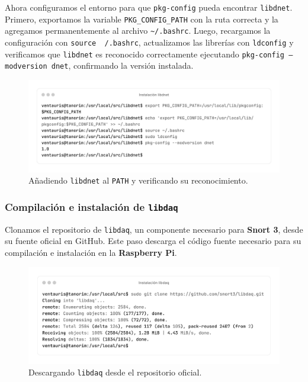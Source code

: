 \documentclass[11pt,a4paper,twoside]{report}
\begin{document}
Ahora configuramos el entorno para que \texttt{pkg-config} pueda encontrar \texttt{libdnet}. Primero, exportamos la variable \texttt{PKG\_CONFIG\_PATH} con la ruta correcta y la agregamos permanentemente al archivo \texttt{\~{}/.bashrc}. Luego, recargamos la configuración con \texttt{source ~/.bashrc}, actualizamos las librerías con \texttt{ldconfig} y verificamos que \texttt{libdnet} es reconocido correctamente ejecutando \texttt{pkg-config --modversion dnet}, confirmando la versión instalada.

\begin{figure}[H]
	\centering
	\includegraphics[scale=0.12]{instalacion_snort/8-8.png}
	\caption{Añadiendo \texttt{libdnet} al \texttt{PATH} y verificando su reconocimiento.}
\end{figure}

\newpage

\subsubsection*{Compilación e instalación de \texttt{libdaq}}

Clonamos el repositorio de \texttt{libdaq}, un componente necesario para \textbf{Snort 3}, desde su fuente oficial en GitHub. Este paso descarga el código fuente necesario para su compilación e instalación en la \textbf{Raspberry Pi}.

\begin{figure}[H]
	\centering
	\includegraphics[scale=0.12]{instalacion_snort/9-9.png}
	\caption{Descargando \texttt{libdaq} desde el repositorio oficial.}
\end{figure}
\end{document}
